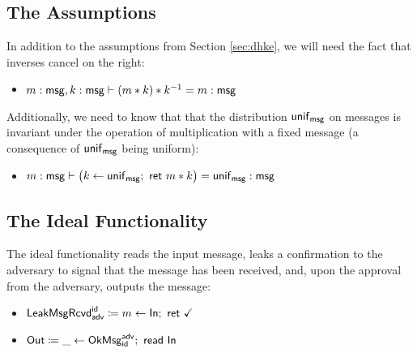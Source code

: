 \subsection{The Assumptions}
In addition to the assumptions from Section \ref{sec:dhke}, we will need the fact that inverses cancel on the right:
\begin{itemize}
\item $m : \mathsf{msg}, k : \mathsf{msg} \vdash (m * k) * k^{-1} = m : \mathsf{msg}$
\end{itemize}
Additionally, we need to know that that the distribution $\mathsf{unif}_{\mathsf{msg}}$ on messages is invariant under the operation of multiplication with a fixed message (a consequence of $\mathsf{unif}_{\mathsf{msg}}$ being uniform):
\begin{itemize}
\item $m : \mathsf{msg} \vdash \big(k \leftarrow \mathsf{unif}_{\mathsf{msg}}; \ \mathsf{ret} \ m * k\big) = \mathsf{unif}_{\mathsf{msg}} : \mathsf{msg}$
\end{itemize}

\subsection{The Ideal Functionality}
The ideal functionality reads the input message, leaks a confirmation to the adversary to signal that the message has been received, and, upon the approval from the adversary, outputs the message:
\begin{itemize}
\item $\mathsf{LeakMsgRcvd}^{\mathsf{id}}_{\mathsf{adv}} \coloneqq m \leftarrow \mathsf{In}; \ \mathsf{ret} \ \checkmark$
\item $\mathsf{Out} \coloneqq \_ \leftarrow \mathsf{OkMsg}^{\mathsf{adv}}_{\mathsf{id}}; \ \mathsf{read} \ \mathsf{In}$
\end{itemize}

